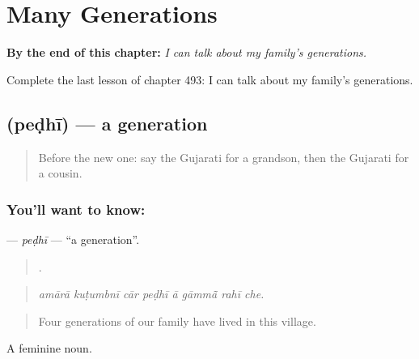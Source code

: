 
\chapter{Many Generations}
\label{ch:gu-many-generations}

\begin{chapteropening}
\textbf{By the end of this chapter:} \emph{I can talk about my family's generations.}

Complete the last lesson of chapter 493: I can talk about my family's generations.
\end{chapteropening}

\section[\texorpdfstring{\gu{પેઢી} (peḍhī)}{પેઢી (peḍhī)}]{ (peḍhī) — a generation}

\label{lesson:GU-C493-pedhi}



\begin{quote}
Before the new one: say the Gujarati for a grandson, then the Gujarati for a cousin.
\end{quote}

\subsection*{You'll want to know: }
\textbf{} — \emph{peḍhī} — \textquotedblleft{}a generation\textquotedblright{}.

\begin{quote}
       .
\end{quote}

\begin{quote}
\emph{amārā kuṭumbnī cār peḍhī ā gāmmā̃ rahī che.}
\end{quote}

\begin{quote}
Four generations of our family have lived in this village.
\end{quote}

A feminine noun.

